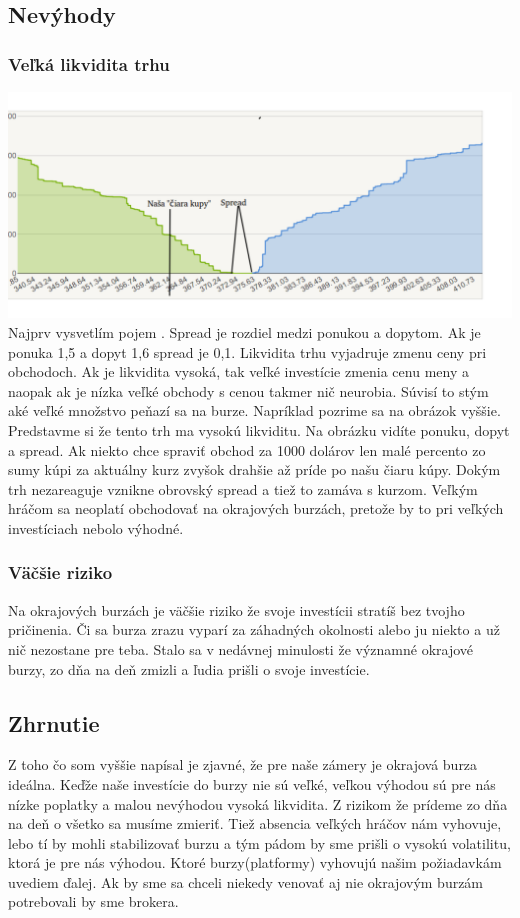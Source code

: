 \subsection{Nevýhody} 
\subsubsection{Veľká likvidita trhu} 
\includegraphics[width=1\textwidth]{stamp} 
Najprv vysvetlím pojem \cite{ZAC}. Spread je rozdiel medzi ponukou a dopytom. Ak je ponuka 1,5 a dopyt 1,6 spread je 0,1. Likvidita trhu vyjadruje zmenu ceny pri obchodoch. Ak je likvidita vysoká, tak veľké investície zmenia cenu meny a naopak ak je nízka veľké obchody s cenou takmer nič neurobia. Súvisí to stým aké veľké množstvo peňazí sa  na burze. Napríklad pozrime sa na obrázok vyššie. Predstavme si že tento trh ma vysokú likviditu. Na obrázku vidíte ponuku, dopyt a spread. Ak niekto chce spraviť obchod za 1000 dolárov len malé percento zo sumy kúpi za aktuálny kurz zvyšok drahšie až príde po našu čiaru kúpy. Dokým trh nezareaguje vznikne obrovský spread a tiež to zamáva s kurzom. Veľkým hráčom sa neoplatí obchodovať na okrajových burzách, pretože by to pri veľkých investíciach nebolo výhodné. 
\subsubsection{Väčšie riziko} 
Na okrajových burzách je väčšie riziko že svoje investícii stratíš bez tvojho pričinenia. Či sa burza zrazu vyparí za záhadných okolnosti alebo ju niekto  a už nič nezostane pre teba. Stalo sa v nedávnej minulosti že významné okrajové burzy, zo dňa na deň zmizli a ľudia prišli o svoje investície.  
\subsection{Zhrnutie} 
Z toho čo som vyššie napísal je zjavné,  že pre naše zámery je okrajová burza ideálna. Keďže naše investície do burzy nie sú veľké, veľkou výhodou sú pre nás nízke poplatky a malou nevýhodou vysoká likvidita. Z rizikom že prídeme zo dňa na deň o všetko sa musíme zmieriť. Tiež absencia veľkých hráčov nám vyhovuje, lebo tí by mohli stabilizovať burzu a tým pádom by sme prišli o vysokú volatilitu, ktorá je pre nás výhodou. Ktoré burzy(platformy) vyhovujú našim požiadavkám uvediem ďalej. Ak by sme sa chceli niekedy venovať aj nie okrajovým burzám potrebovali by sme brokera. 
